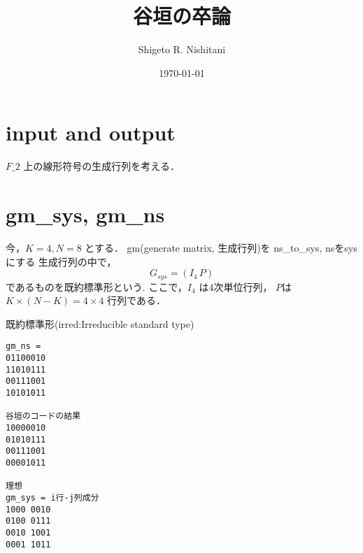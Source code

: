 \documentclass{jsarticle}
\author{Shigeto R. Nishitani}
\date{\today}
\title{谷垣の卒論}
\begin{document}
\maketitle

\section{input and output}
\label{sec:org9a6601a}
$F\_2$ 上の線形符号の生成行列を考える．

\section{gm\_sys, gm\_ns}
\label{sec:orgd9893d9}
今，$K=4, N=8$ とする．
gm(generate matrix, 生成行列)を
ns\_to\_sys, nsをsysにする
生成行列の中で，
$$
G_{sys}=(I_4\, P)
$$
であるものを既約標準形という.
ここで，$I_4$ は$4$次単位行列，
$P$は$K \times (N-K)=4\times4$ 行列である．

既約標準形(irred:Irreducible standard type)

\begin{verbatim}
gm_ns = 
01100010
11010111
00111001
10101011

谷垣のコードの結果
10000010
01010111
00111001
00001011

理想
gm_sys = i行-j列成分
1000 0010
0100 0111
0010 1001
0001 1011
\end{verbatim}
\end{document}
